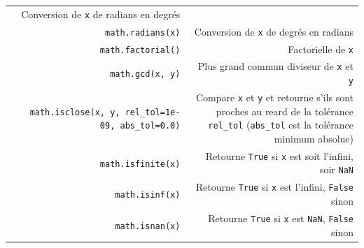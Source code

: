 \documentclass[12pt,]{book}
\numberwithin{equation}{section}
\numberwithin{countremarque}{section}
\begin{document}
\begin{longtable}[]{@{}rr@{}}
\begin{minipage}[t]{0.60\columnwidth}
Conversion de \texttt{x} de radians en degrés\strut
\end{minipage}\tabularnewline
\begin{minipage}[t]{0.21\columnwidth}\raggedleft\strut
\texttt{math.radians(x)}\strut
\end{minipage} & \begin{minipage}[t]{0.60\columnwidth}\raggedleft\strut
Conversion de \texttt{x} de degrés en radians\strut
\end{minipage}\tabularnewline
\begin{minipage}[t]{0.21\columnwidth}\raggedleft\strut
\texttt{math.factorial()}\strut
\end{minipage} & \begin{minipage}[t]{0.60\columnwidth}\raggedleft\strut
Factorielle de \texttt{x}\strut
\end{minipage}\tabularnewline
\begin{minipage}[t]{0.21\columnwidth}\raggedleft\strut
\texttt{math.gcd(x,\ y)}\strut
\end{minipage} & \begin{minipage}[t]{0.60\columnwidth}\raggedleft\strut
Plus grand commun diviseur de \texttt{x} et \texttt{y}\strut
\end{minipage}\tabularnewline
\begin{minipage}[t]{0.21\columnwidth}\raggedleft\strut
\texttt{math.isclose(x,\ y,\ rel\_tol=1e-09,\ abs\_tol=0.0)}\strut
\end{minipage} & \begin{minipage}[t]{0.60\columnwidth}\raggedleft\strut
Compare \texttt{x} et \texttt{y} et retourne s'ils sont proches au reard
de la tolérance \texttt{rel\_tol} (\texttt{abs\_tol} est la tolérance
minimum absolue)\strut
\end{minipage}\tabularnewline
\begin{minipage}[t]{0.21\columnwidth}\raggedleft\strut
\texttt{math.isfinite(x)}\strut
\end{minipage} & \begin{minipage}[t]{0.60\columnwidth}\raggedleft\strut
Retourne \texttt{True} si \texttt{x} est soit l'infini, soir
\texttt{NaN}\strut
\end{minipage}\tabularnewline
\begin{minipage}[t]{0.21\columnwidth}\raggedleft\strut
\texttt{math.isinf(x)}\strut
\end{minipage} & \begin{minipage}[t]{0.60\columnwidth}\raggedleft\strut
Retourne \texttt{True} si \texttt{x} est l'infini, \texttt{False}
sinon\strut
\end{minipage}\tabularnewline
\begin{minipage}[t]{0.21\columnwidth}\raggedleft\strut
\texttt{math.isnan(x)}\strut
\end{minipage} & \begin{minipage}[t]{0.60\columnwidth}\raggedleft\strut
Retourne \texttt{True} si \texttt{x} est \texttt{NaN}, \texttt{False}
sinon\strut
\end{minipage}\tabularnewline
\bottomrule
\end{longtable}
\end{document}
